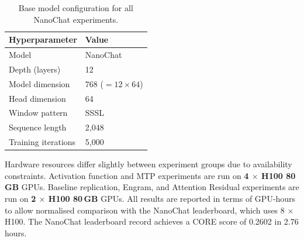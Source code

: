 \begin{table}[H]
\centering
\caption{Base model configuration for all NanoChat experiments.}
\label{tab:model_settings}
\begin{tabular}{ll}
\hline
\textbf{Hyperparameter} & \textbf{Value} \\
\hline
Model                   & NanoChat        \\
Depth (layers)          & 12              \\
Model dimension         & 768 ($= 12 \times 64$) \\
Head dimension          & 64              \\
Window pattern          & SSSL            \\
Sequence length         & 2{,}048          \\
Training iterations     & 5{,}000          \\
\hline
\end{tabular}
\end{table}

Hardware resources differ slightly between experiment groups due to availability constraints.
Activation function and MTP experiments are run on \textbf{4 $\times$ H100 80\,GB} GPUs.
Baseline replication, Engram, and Attention Residual experiments are run on
\textbf{2 $\times$ H100 80\,GB} GPUs.
All results are reported in terms of GPU-hours to allow normalised comparison with the NanoChat
leaderboard, which uses 8 $\times$ H100.
The NanoChat leaderboard record achieves a CORE score of 0.2602 in 2.76 hours.
